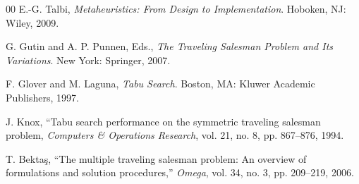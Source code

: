 \begin{thebibliography}{00}
 E.-G. Talbi,
\textit{Metaheuristics: From Design to Implementation}.
Hoboken, NJ: Wiley, 2009.

 G. Gutin and A. P. Punnen, Eds.,
\textit{The Traveling Salesman Problem and Its Variations}.
New York: Springer, 2007.

 F. Glover and M. Laguna,
\textit{Tabu Search}.
Boston, MA: Kluwer Academic Publishers, 1997.

 J. Knox,
``Tabu search performance on the symmetric traveling salesman problem,
\textit{Computers \& Operations Research}, vol. 21, no. 8, pp. 867--876, 1994.

 T. Bekta\c{s},
``The multiple traveling salesman problem: An overview of formulations and solution procedures,''
\textit{Omega}, vol. 34, no. 3, pp. 209--219, 2006.

\end{thebibliography}